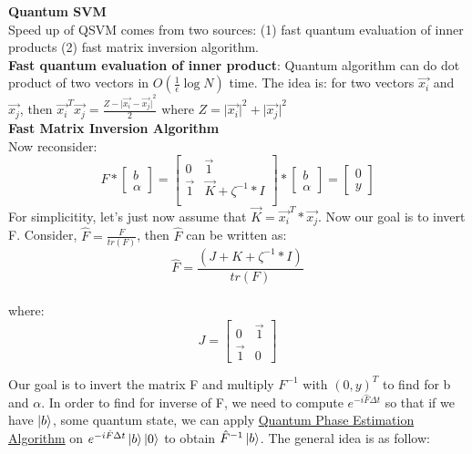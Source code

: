 \documentclass[11pt]{article}
\begin{document}
\textbf{\large Quantum SVM} \\

Speed up of QSVM comes from two sources: (1) fast quantum evaluation of inner products (2) fast matrix inversion algorithm.\\

\textbf{Fast quantum evaluation of inner product}: Quantum algorithm can do dot product of two vectors in $O(\frac{1}{\epsilon} \log N)$ time. The idea is: for two vectors $\vec{x_{i}}$ and $\vec{x_{j}}$, then $\vec{x_{i}}^T \vec{x_{j}} = \frac{Z - {\vert \vec{x_{i}} - \vec{x_{j}} \vert}^{2}}{2}$ where $Z = {\vert \vec{x_{i}} \vert}^{2} + {\vert \vec{x_{j}} \vert}^{2}$ \\

\textbf{Fast Matrix Inversion Algorithm} \\

Now reconsider:
\[
F
*
\begin{bmatrix}
b \\ \alpha
\end{bmatrix}
=
\begin{bmatrix}
0 & \vec{1} \\
\vec{1} & \vec{K} + \zeta^{-1} * I \\
\end{bmatrix}
*
\begin{bmatrix}
b \\ \alpha
\end{bmatrix}
=
\begin{bmatrix}
0 \\ y
\end{bmatrix}
\]
For simplicitity, let's just now assume that $\vec{K} = \vec{x_{i}}^T * \vec{x_{j}}$. Now our goal is to invert F. Consider, $\hat{F} = \frac{F}{tr(F)}$, then $\hat{F}$ can be written as:
$$\hat{F} = \frac{(J + K + \zeta^{-1} * I)}{tr(F)}$$ \\
where: 
\[
J = 
\begin{bmatrix}
0 & \vec{1} \\
\vec{1} & 0
\end{bmatrix}
\]

Our goal is to invert the matrix F and multiply $F^{-1}$ with $(0, y)^{T}$ to find for b and $\alpha$. In order to find for inverse of F, we need to compute $e^{-i\hat{F} \Delta t}$ so that if we have $\ket{b}$, some quantum state, we can apply \href{https://qiskit.github.io/ibmqx-user-guides/full-user-guide/004-Quantum_Algorithms/100-Quantum_Phase_Estimation.html}{Quantum Phase Estimation Algorithm} on $e^{-i\hat{F} \Delta t} \ket{b} \ket{0}$ to obtain $\hat{F}^{-1} \ket{b}$. The general idea is as follow:
\end{document}

